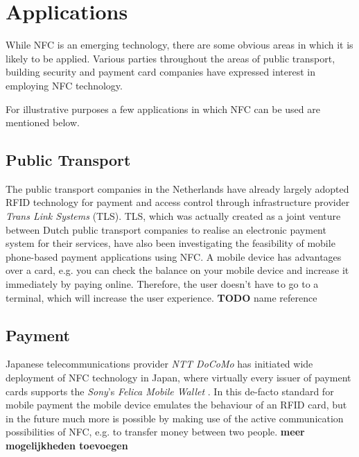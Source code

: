 \section{Applications}
While NFC is an emerging technology, there are some obvious areas in which it is likely to be applied.
Various parties throughout the areas of public transport, building security and payment card companies have expressed interest in employing NFC technology.

For illustrative purposes a few applications in which NFC can be used are mentioned below.

\subsection{Public Transport}
The public transport companies in the Netherlands have already largely adopted RFID technology for payment and access control through infrastructure provider \textit{Trans Link Systems} (TLS).
TLS, which was actually created as a joint venture between Dutch public transport companies to realise an electronic payment system for their services, have also been investigating the feasibility of mobile phone-based payment applications using NFC. %
A mobile device has advantages over a card, e.g. you can check the balance on your mobile device and increase it immediately by paying online. Therefore, the user doesn't have to go to a terminal, which will increase the user experience.
\textbf{TODO} name reference




\subsection{Payment}
Japanese telecommunications provider \textit{NTT DoCoMo} has initiated wide deployment of NFC technology in Japan, where virtually every issuer of payment cards supports the \textit{Sony}'s \textit{Felica Mobile Wallet} \cite{yamauchi2006intensive}.
In this de-facto standard for mobile payment the mobile device emulates the behaviour of an RFID card, but in the future much more is possible by making use of the active communication possibilities of NFC, e.g. to transfer money between two people. \textbf{meer mogelijkheden toevoegen} %


